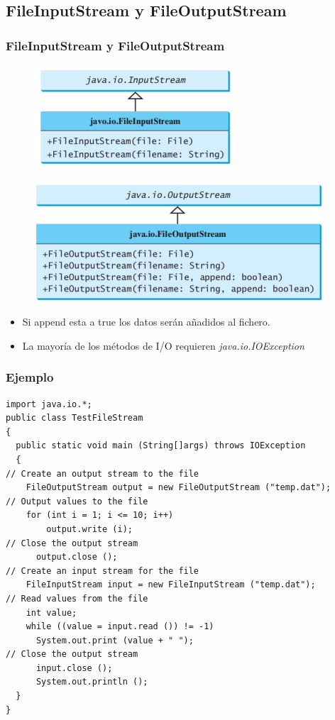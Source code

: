\documentclass{beamer}
\begin{document}
\subsection{FileInputStream y FileOutputStream}
\begin{frame}
\frametitle{FileInputStream y FileOutputStream} 
\begin{multicols}{2}
\begin{figure}
\includegraphics[scale=0.6]{imagenes/fi.png} 
\end{figure}
\begin{figure}
\includegraphics[scale=0.45]{imagenes/fo.png} 
\end{figure} 
\begin{itemize}[<+->]
\item Si append esta a true los datos serán añadidos al fichero.
\item La mayoría de los métodos de I/O requieren \emph{java.io.IOException}
\end{itemize}
\end{multicols}
\end{frame}

\begin{frame}[fragile]
\frametitle{Ejemplo}
\begin{scriptsize}
\begin{verbatim}
import java.io.*;
public class TestFileStream
{
  public static void main (String[]args) throws IOException
  {
// Create an output stream to the file
    FileOutputStream output = new FileOutputStream ("temp.dat");
// Output values to the file
    for (int i = 1; i <= 10; i++)
        output.write (i);
// Close the output stream
      output.close ();
// Create an input stream for the file
    FileInputStream input = new FileInputStream ("temp.dat");
// Read values from the file
    int value;
    while ((value = input.read ()) != -1)
      System.out.print (value + " ");
// Close the output stream
      input.close ();
      System.out.println ();
  }
}
\end{verbatim}
\end{scriptsize}
\end{frame}
\end{document}
